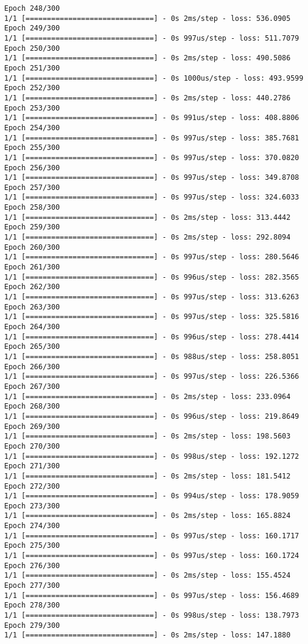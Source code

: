 \documentclass[11pt]{article}
\begin{document}
\begin{Verbatim}[commandchars=\\\{\}]
Epoch 248/300
1/1 [==============================] - 0s 2ms/step - loss: 536.0905
Epoch 249/300
1/1 [==============================] - 0s 997us/step - loss: 511.7079
Epoch 250/300
1/1 [==============================] - 0s 2ms/step - loss: 490.5086
Epoch 251/300
1/1 [==============================] - 0s 1000us/step - loss: 493.9599
Epoch 252/300
1/1 [==============================] - 0s 2ms/step - loss: 440.2786
Epoch 253/300
1/1 [==============================] - 0s 991us/step - loss: 408.8806
Epoch 254/300
1/1 [==============================] - 0s 997us/step - loss: 385.7681
Epoch 255/300
1/1 [==============================] - 0s 997us/step - loss: 370.0820
Epoch 256/300
1/1 [==============================] - 0s 997us/step - loss: 349.8708
Epoch 257/300
1/1 [==============================] - 0s 997us/step - loss: 324.6033
Epoch 258/300
1/1 [==============================] - 0s 2ms/step - loss: 313.4442
Epoch 259/300
1/1 [==============================] - 0s 2ms/step - loss: 292.8094
Epoch 260/300
1/1 [==============================] - 0s 997us/step - loss: 280.5646
Epoch 261/300
1/1 [==============================] - 0s 996us/step - loss: 282.3565
Epoch 262/300
1/1 [==============================] - 0s 997us/step - loss: 313.6263
Epoch 263/300
1/1 [==============================] - 0s 997us/step - loss: 325.5816
Epoch 264/300
1/1 [==============================] - 0s 996us/step - loss: 278.4414
Epoch 265/300
1/1 [==============================] - 0s 988us/step - loss: 258.8051
Epoch 266/300
1/1 [==============================] - 0s 997us/step - loss: 226.5366
Epoch 267/300
1/1 [==============================] - 0s 2ms/step - loss: 233.0964
Epoch 268/300
1/1 [==============================] - 0s 996us/step - loss: 219.8649
Epoch 269/300
1/1 [==============================] - 0s 2ms/step - loss: 198.5603
Epoch 270/300
1/1 [==============================] - 0s 998us/step - loss: 192.1272
Epoch 271/300
1/1 [==============================] - 0s 2ms/step - loss: 181.5412
Epoch 272/300
1/1 [==============================] - 0s 994us/step - loss: 178.9059
Epoch 273/300
1/1 [==============================] - 0s 2ms/step - loss: 165.8824
Epoch 274/300
1/1 [==============================] - 0s 997us/step - loss: 160.1717
Epoch 275/300
1/1 [==============================] - 0s 997us/step - loss: 160.1724
Epoch 276/300
1/1 [==============================] - 0s 2ms/step - loss: 155.4524
Epoch 277/300
1/1 [==============================] - 0s 997us/step - loss: 156.4689
Epoch 278/300
1/1 [==============================] - 0s 998us/step - loss: 138.7973
Epoch 279/300
1/1 [==============================] - 0s 2ms/step - loss: 147.1880

\end{Verbatim}
\end{document}
